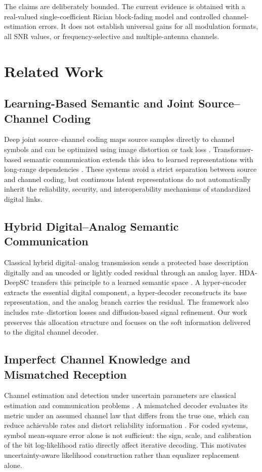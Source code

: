 \documentclass[conference]{IEEEtran}
\begin{document}
The claims are deliberately bounded. The current evidence is obtained with a real-valued single-coefficient Rician block-fading model and controlled channel-estimation errors. It does not establish universal gains for all modulation formats, all SNR values, or frequency-selective and multiple-antenna channels.

\section{Related Work}
\subsection{Learning-Based Semantic and Joint Source--Channel Coding}
Deep joint source--channel coding maps source samples directly to channel symbols and can be optimized using image distortion or task loss \cite{bourtsoulatze2019deepjscc}. Transformer-based semantic communication extends this idea to learned representations with long-range dependencies \cite{xie2021deepsc,liu2021swin}. These systems avoid a strict separation between source and channel coding, but continuous latent representations do not automatically inherit the reliability, security, and interoperability mechanisms of standardized digital links.

\subsection{Hybrid Digital--Analog Semantic Communication}
Classical hybrid digital--analog transmission sends a protected base description digitally and an uncoded or lightly coded residual through an analog layer. HDA-DeepSC transfers this principle to a learned semantic space \cite{xie2025hda}. A hyper-encoder extracts the essential digital component, a hyper-decoder reconstructs its base representation, and the analog branch carries the residual. The framework also includes rate--distortion losses and diffusion-based signal refinement. Our work preserves this allocation structure and focuses on the soft information delivered to the digital channel decoder.

\subsection{Imperfect Channel Knowledge and Mismatched Reception}
Channel estimation and detection under uncertain parameters are classical estimation and communication problems \cite{kay1993estimation,proakis2007digital,goldsmith2005wireless}. A mismatched decoder evaluates its metric under an assumed channel law that differs from the true one, which can reduce achievable rates and distort reliability information \cite{merhav1994mismatched}. For coded systems, symbol mean-square error alone is not sufficient: the sign, scale, and calibration of the bit log-likelihood ratio directly affect iterative decoding. This motivates uncertainty-aware likelihood construction rather than equalizer replacement alone.
\end{document}
